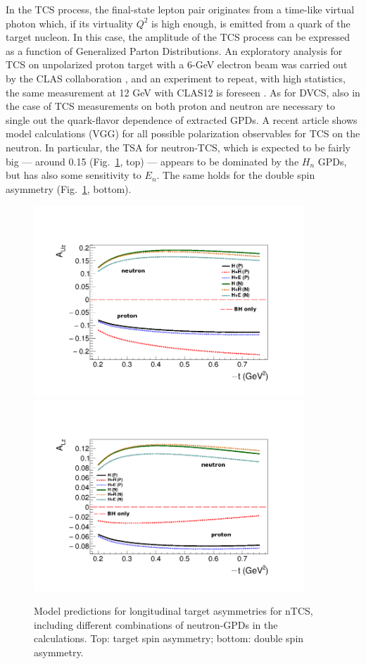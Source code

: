 \documentclass[a4paper,12pt]{report}
\begin{document}
In the TCS process, the final-state lepton pair originates from a time-like virtual photon which, if its virtuality $Q^2$ is high enough, is emitted from a quark of the target nucleon. In this case, the amplitude of the TCS process can be expressed as a function of Generalized Parton Distributions. 
An exploratory analysis for TCS on unpolarized proton target with a 6-GeV electron beam was carried out by the CLAS collaboration \cite{rafo_phd}, and an experiment to repeat, with high statistics, the same measurement at 12 GeV with CLAS12 is foreseen \cite{tcs_proton_clas12}. As for DVCS, also in the case of TCS measurements on both proton and neutron are necessary to single out the quark-flavor dependence of extracted GPDs. A recent article \cite{michel_nTCS} shows model calculations (VGG) for all possible polarization observables for TCS on the neutron. In particular, the TSA for neutron-TCS, which is expected to be fairly big --- around 0.15 (Fig.~\ref{tcs_tsa}, top) --- appears to be dominated by the $H_n$ GPDs, but has also some sensitivity to $E_n$. The same holds for the double spin asymmetry (Fig.~\ref{tcs_tsa}, bottom). 
\begin{figure}[htbp] 
   \centering
   \includegraphics[width=4in]{neutron_fig6C.png} 
   \includegraphics[width=4in]{neutron_fig7C.png} 
   \caption{Model predictions for longitudinal target asymmetries for nTCS, including different combinations of neutron-GPDs in the calculations. Top: target spin asymmetry; bottom: double spin asymmetry.}
   \label{tcs_tsa}
\end{figure}
\end{document}

